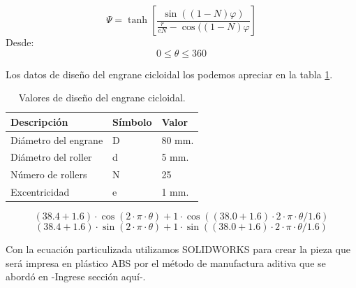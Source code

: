\begin{equation}
\Psi = \tanh \left[ \frac{\sin((1-N)\varphi)}{\frac{r}{eN}-\cos((1-N)\varphi} \right]
\end{equation}
Desde:
$$
0 \leq \theta \leq 360
$$

Los datos de diseño del engrane cicloidal los podemos apreciar en la tabla \ref{table:valorescicloidal}.

\begin{table}
\centering
\caption{Valores de diseño del engrane cicloidal.}
\label{table:valorescicloidal}
\begin{tabular}{l|l|l|}
\textbf{Descripción} & \textbf{Símbolo} & \textbf{Valor}  \\ 
\hline
Diámetro del engrane & D                & 80 mm.          \\
Diámetro del roller  & d                & 5 mm.           \\
Número de rollers    & N                & 25              \\
Excentricidad        & e                & 1 mm.          
\end{tabular}
\end{table}


\begin{equation}
(38.4 + 1.6) \cdot \cos(2 \cdot \pi \cdot \theta) + 1 \cdot \cos((38.0 + 1.6) \cdot 2 \cdot \pi \cdot \theta / 1.6)
\end{equation}
\begin{equation}
(38.4 + 1.6) \cdot \sin(2 \cdot \pi \cdot \theta) + 1 \cdot \sin((38.0 + 1.6) \cdot 2 \cdot \pi \cdot \theta / 1.6)
\end{equation}

Con la ecuación particulizada utilizamos SOLIDWORKS para crear la pieza que será impresa en plástico ABS por el método de manufactura aditiva que se abordó en -Ingrese sección aquí-.


